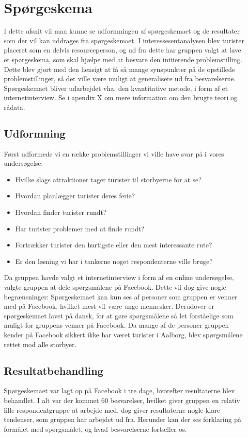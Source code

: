 \section{Spørgeskema}
I dette afsnit vil man kunne se udformningen af spørgeskemaet og de resultater som der vil kan uddrages fra spørgeskemaet. I interessesentanalysen blev turister placeret som en delvis resourceperson, og ud fra dette har gruppen valgt at lave et spørgeskema, som skal hjælpe med at besvare den initierende problemstilling. Dette blev gjort med den hensigt at få så mange synspunkter på de opstillede problemstillinger, så det ville være muligt at generalisere ud fra besvarelserne. Spørgeskemaet bliver udarbejdet vha. den kvantitative metode, i form af et internetinterview. Se i apendix X om mere information om den brugte teori og rådata.

\subsection{Udformning}
Først udformede vi en række problemstillinger vi ville have svar på i vores undersøgelse: 
\begin{itemize}
\item Hvilke slags attraktioner tager turister til storbyerne for at se?
\item Hvordan planlægger turister deres ferie?
\item Hvordan finder turister rundt?
\item Har turister problemer med at finde rundt?
\item Fortrækker turister den hurtigste eller den mest interessante rute?
\item Er den løsning vi har i tankerne noget respondenterne ville bruge?
\end{itemize}
Da gruppen havde valgt et internetinterview i form af en online undersøgelse, valgte gruppen at dele spørgsmålene på Facebook. Dette vil dog give nogle begrænsninger: Spørgeskemaet kan kun ses af personer som gruppen er venner med på Facebook, hvilket mest vil være unge mennesker. Derudover er spørgeskemaet lavet på dansk, for at gøre spørgsmålene så let forståelige som muligt for gruppens venner på Facebook. Da mange af de personer gruppen kender på Facebook sikkert ikke har været turister i Aalborg, blev spørgsmålene rettet mod alle storbyer.
\subsection{Resultatbehandling}
Spørgeskemaet var lagt op på Facebook i tre dage, hvorefter resultaterne blev behandlet. I alt var der kommet 60 besvarelser, hvilket giver gruppen en relativ lille respondentgruppe at arbejde med, dog giver resultaterne nogle klare tendenser, som gruppen har arbejdet ud fra. Herunder kan der ses forklaring på formålet med spørgsmålet, og hvad besvarelserne fortæller os.

